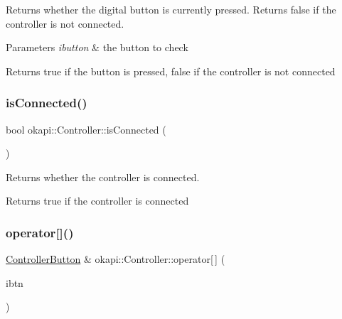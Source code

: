 Returns whether the digital button is currently pressed. Returns false if the controller is not connected.


\begin{DoxyParams}{Parameters}
{\em ibutton} & the button to check \\
\hline
\end{DoxyParams}
\begin{DoxyReturn}{Returns}
true if the button is pressed, false if the controller is not connected 
\end{DoxyReturn}
\mbox{\label{classokapi_1_1Controller_a0cad97dfa473a47c4c3551374eb96e54}} 
\subsubsection{\texorpdfstring{isConnected()}{isConnected()}}
{\footnotesize\ttfamily bool okapi\+::\+Controller\+::is\+Connected (\begin{DoxyParamCaption}{ }\end{DoxyParamCaption})\hspace{0.3cm}{\ttfamily [virtual]}}

Returns whether the controller is connected.

\begin{DoxyReturn}{Returns}
true if the controller is connected 
\end{DoxyReturn}
\mbox{\label{classokapi_1_1Controller_a88c9b0063ad8455840f9ac8c24610ff0}} 
\subsubsection{\texorpdfstring{operator[]()}{operator[]()}}
{\footnotesize\ttfamily \mbox{\hyperlink{classokapi_1_1ControllerButton}{Controller\+Button}} \& okapi\+::\+Controller\+::operator\mbox{[}$\,$\mbox{]} (\begin{DoxyParamCaption}\item[{\mbox{\hyperlink{namespaceokapi_af5040b3f1f33d27698871423e1453ab6}{Controller\+Digital}}}]{ibtn }\end{DoxyParamCaption})\hspace{0.3cm}{\ttfamily [virtual]}}

